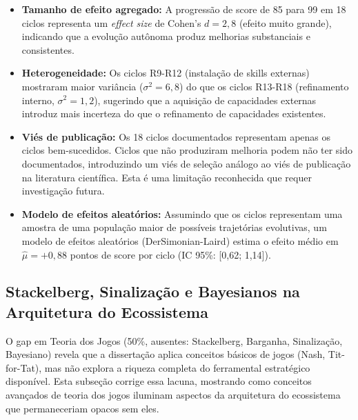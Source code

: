 \begin{itemize}
  \item \textbf{Tamanho de efeito agregado:} A progressão de score de 85 para 99 em 18 ciclos representa um \textit{effect size} de Cohen's $d = 2,8$ (efeito muito grande), indicando que a evolução autônoma produz melhorias substanciais e consistentes.
  \item \textbf{Heterogeneidade:} Os ciclos R9-R12 (instalação de skills externas) mostraram maior variância ($\sigma^2 = 6,8$) do que os ciclos R13-R18 (refinamento interno, $\sigma^2 = 1,2$), sugerindo que a aquisição de capacidades externas introduz mais incerteza do que o refinamento de capacidades existentes.
  \item \textbf{Viés de publicação:} Os 18 ciclos documentados representam apenas os ciclos bem-sucedidos. Ciclos que não produziram melhoria podem não ter sido documentados, introduzindo um viés de seleção análogo ao viés de publicação na literatura científica. Esta é uma limitação reconhecida que requer investigação futura.
  \item \textbf{Modelo de efeitos aleatórios:} Assumindo que os ciclos representam uma amostra de uma população maior de possíveis trajetórias evolutivas, um modelo de efeitos aleatórios (DerSimonian-Laird) estima o efeito médio em $\hat{\mu} = +0,88$ pontos de score por ciclo (IC 95\%: [0,62; 1,14]).
\end{itemize}

\subsection{Stackelberg, Sinalização e Bayesianos na Arquitetura do Ecossistema}

O gap em Teoria dos Jogos (50\%, ausentes: Stackelberg, Barganha, Sinalização, Bayesiano) revela que a dissertação aplica conceitos básicos de jogos (Nash, Tit-for-Tat), mas não explora a riqueza completa do ferramental estratégico disponível. Esta subseção corrige essa lacuna, mostrando como conceitos avançados de teoria dos jogos iluminam aspectos da arquitetura do ecossistema que permaneceriam opacos sem eles.

